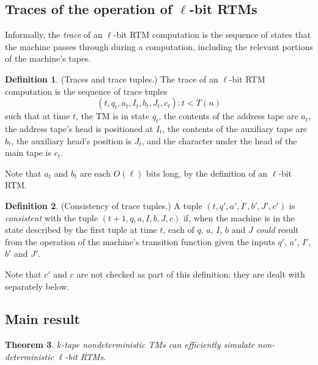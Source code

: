 \documentclass[english]{article}
\theoremstyle{plain}
\newtheorem{thm}{Theorem}
\theoremstyle{definition}
\newtheorem{defn}[thm]{Definition}
\theoremstyle{plain}
\begin{document}
\subsection{Traces of the operation of $\ell$-bit RTMs}

Informally, the \emph{trace} of an $\ell$-bit RTM computation is the
sequence of states that the machine passes through during a
computation, including the relevant portions of the machine's tapes.

\begin{defn}
  (Traces and trace tuples.) The trace of an $\ell$-bit RTM
  computation is the sequence of trace tuples
  \[
  (t,q_t,a_t,I_t,b_t,J_t,c_t): t < T(n)
  \]
  such that at time $t$, the TM is in state $q_t$, the contents of the
  address tape are $a_t$, the address tape's head is positioned at
  $I_t$, the contents of the auxiliary tape are $b_t$, the auxiliary
  head's position is $J_t$, and the character under the head of the
  main tape is $c_t$.
\end{defn}

Note that $a_t$ and $b_t$ are each $O(\ell)$ bits long, by the
definition of an $\ell$-bit RTM.

\begin{defn}
  (Consistency of trace tuples.) A tuple $(t, q', a', I', b', J', c')$
  is \emph{consistent} with the tuple $(t+1, q, a, I, b, J, c)$ if,
  when the machine is in the state described by the first tuple at
  time $t$, each of $q$, $a$, $I$, $b$ and $J$ \emph{could} result
  from the operation of the machine's transition function given the
  inputs $q'$, $a'$, $I'$, $b'$ and $J'$.
\end{defn}

Note that $c'$ and $c$ are not checked as part of this definition:
they are dealt with separately below.

\subsection{Main result}

\begin{thm}
  $k$-tape nondeterministic TMs can efficiently simulate
  non-deterministic $\ell$-bit RTMs.
\end{thm}
\end{document}
